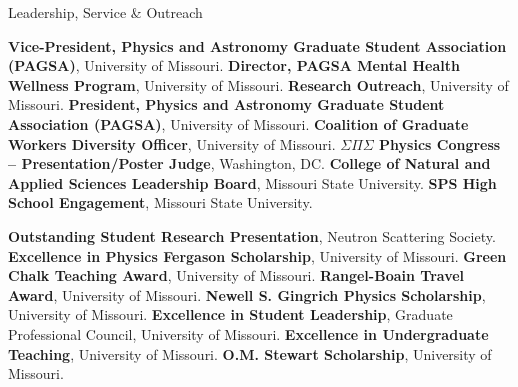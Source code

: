 \begin{rubric}{Leadership, Service \& Outreach}

\entry*[2023--2024] \textbf{Vice-President, Physics and Astronomy Graduate Student Association (PAGSA)}, University of Missouri.
\entry*[2022--2024] \textbf{Director, PAGSA Mental Health Wellness Program}, University of Missouri.
\entry*[2022--2024] \textbf{Research Outreach}, University of Missouri.
\entry*[2022--2023] \textbf{President, Physics and Astronomy Graduate Student Association (PAGSA)}, University of Missouri.
\entry*[2022--2023] \textbf{Coalition of Graduate Workers Diversity Officer}, University of Missouri.
\entry*[2022]       \textbf{$\Sigma \Pi \Sigma$ Physics Congress – Presentation/Poster Judge}, Washington, DC.
\entry*[2018--2019] \textbf{College of Natural and Applied Sciences Leadership Board}, Missouri State University.
\entry*[2017--2020] \textbf{SPS High School Engagement}, Missouri State University.

\entry*[2023] \textbf{Outstanding Student Research Presentation}, Neutron Scattering Society.
\entry*[2023] \textbf{Excellence in Physics Fergason Scholarship}, University of Missouri.
\entry*[2023] \textbf{Green Chalk Teaching Award}, University of Missouri.
\entry*[2023] \textbf{Rangel-Boain Travel Award}, University of Missouri.
\entry*[2022] \textbf{Newell S. Gingrich Physics Scholarship}, University of Missouri.
\entry*[2022] \textbf{Excellence in Student Leadership}, Graduate Professional Council, University of Missouri.
\entry*[2022] \textbf{Excellence in Undergraduate Teaching}, University of Missouri.
\entry*[2021] \textbf{O.M. Stewart Scholarship}, University of Missouri.

\end{rubric}
